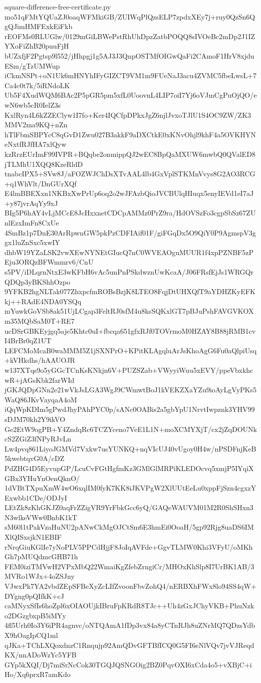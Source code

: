 \documentclass[11pt]{article}
\theoremstyle{definition}
\theoremstyle{remark}
\begin{document}
\begin{filecontents*}[overwrite]{square-difference-free-certificate.py}
mo51qFMtYQUaZJ0oaqWFMkiGB/ZUIWqPlQzsELP7zpdxXEy7j+ruy0QzSn6QgQJimHMFExkEiFkb
rEOFMs0RLUGlw/0129mGiLBWePstRhUhDpzZatbPOQQ8sIVOeBc2mDp2J1IZYXoFiZhB20puuFjH
bUZxfjF2Pgtsp9l552/jHhpgj1g5AJ3J3QnpOSTMfOIGwQaFi2CAmoF1HrV8xjduESm/gTzUMWup
iCkmNSPt+oN1Uk6mHNYhIFyGIZCT9VM1m9FUeNaJ3acu4ZVMC5fbeLwsL+7Ca4c0t7k/5iRNdoLK
Ub5F4XudWQM6BAc2P5pGR5pm5xfL0UoovnL4LIP7oiI7Yj6oVJmCgPuOjQO/ewN6wb5cR0IelZ3s
KxlRyn4L6kZZEClyw1I7fo+Ker4IQCfpDPkxJgZ6njlJvxoTJlU1S4OC9ZW/ZK3MMV2ma9KQ+nZn
hTlFbmSBPYcC8qGvD1Zwu027B3akkF9aDXCtkE0xKNvOhjl9khF4a5OVKHYNeNxtfRJfHA7xlQyw
kzRrzEUrImF99IVPR+BQqbe2onmippQJ2wEC8BpQaMXUW6mwbQ0QValED8jTLMhU1XQQ8KzeRldD
tnabcIPX5+SVw8J/aFOZWJChDsXTvAAL4lb4GxVplSTKMnVvys8G2AO3RCG+q1WhVlt/DnGUrXQf
E4lmBBEXxn1NKBxXwPrUp6oq2o2wJFAzbQioJVCBUlqHIuqx5enyIEVd1eI7aJ+y87jvrAqYy9xJ
BIg5P6hAY4vLjMCcE8JcHxxnetCDCpAMMz0PrZ9ra/HdOVSzFo3cgpSbSz67ZUnlEzxImFn8CxUe
4SmBz1p7DnE30ArRpwnGW5pkPzCDFIAif01F/giFGqDx5O9QiY0P9AgmspV3ggx1luZnSxc5xwIY
dhbW19YZaLSK2vwXEwNYNEtGIucQ7nC0WVEAOguMUUR1f4xpPZNBF5zPEju3ORQzBFWmmrv6/CnU
s5PV/iDLqrnNtxE3wKFbH6vAc5unPnPSkdwznUwKcaA/J06FRsfEjJs1WRGQrQDQp3yBKShhOzpo
9YFKB2hgNLTak077ZhxpcfmROBsBzjK8LTEO8FqjDtUHXQfT9aYDHZKyEFKkj++RAdE4NDA0YSQq
mYuwkGoVSb8ak51UjLCgap3FeltRJ0sfM4u8ksSQKxlGT7pBJuPshFAVGVKOXm35MQbSaM0T+RE7
ucDSrGBKEyjgq5aje5Khtc0uI+fbcqa651gfxRJf0TOVrmoM0HZAY8B88jRMB1cvI4BrBr0qZ1UT
LEFCMoMcaB0waMMM5Z1jSXNPrO+KPitKLAgqluArJsKhoAgG6Fu0aQlpiUsq+kVHkdhs/hAAUOJR
w137XTqs9o5yGGcTCnKsKNkjn6V+PUZSZab+VWyyiWuu5xEVY/ppeVbxkhcwR+jAGsKbk2farWId
jGKJQDpGNn2e21wVkJsLGA3WgJ9CWmwtBoJ1kVEKZXaYZu9ioAyLgVyPKs5WaQ86JKvVayqaA4oM
iQqWpKDIm5gPwdJhyPAhPYC0p/sANc0OABis2a5gbYpU1NrvtIwpznk3YHV99sDJM70kh2Y9ikVO
Ge2EtW9ogPB+Y4ZndqRc6TCZYceno7VeE1L1N+moXCMYXjT/cx2jZqDOUNkcS2ZGiZ3fNPyRJvLn
Lw4pvq861LiyoJGMVd7Vxkw7usYUNKQ+nqVIcUJ40vUgoy0H4w/nPSDFnjKeB5kwebtqvG0A/cDZ
PdZHG4D5EyvupGP/LcuCvFGtHgfmKz3GMlGlMRPiKLEDOcvq5xmjP5IYqiXGBx3YHuYnOenQknO/
1dVBtTXpuXmW4wO6xqlIM0fyK7KK8iJKVPgW2XlUUtEeLu0xppFjSzn4cgxzYExwbb1CDe/ODJyI
LEtZk8zKhGKJZ0aqFrZZigVR9YrFbkGcc6yQ/GAQeWAUVM01M2R0ShSHxn3N3wlkeVWw0BnbK1kT
sM60l1tPakVzaHuNU2pANwCkMgOJCtSm6E3hmEi0OoaH/5gp92Rjg8uaDS6IMXlQISxsjkN1EBIF
rNrqGiuKGlIe7yNoPLV5PPCdHjjF8JoIqAVFde+GgvTLMW0Khi3VFyU/oMKhGh7pMUQdmcGHB71h
FEM0iziTMVwH2VPxMbQ22WmaiKgZfebZrngiCr/MHOxKhSlp8I7UrBK1AB/3MVRo1WJx+4oZSJny
VJwxPk7YA2vbdZEpSFBeXyZcLIfZvoonFbvZohQ4/nERBXhFWx8lo94SS4qW+DYgng0pQIfkK+cJ
caMNyxSfIs6hoZpl6xOIAOUjkIBruFpKRdR8TJc++Uh4zGxJChyVKB+PhuNzko2DGzgbxpB5iMYy
4fl5Urh0Io3Y6iPR4agnvc/oNTQAmA1fDp3vx84a8yCTnRJh8uZNrMQ7QDzsYdbX9hOagIpCQ1ml
qJKa+TChLXQoxdnzC1Rnqujp92AmQDvGFTBfICQ0G5FI6eNlVQv7jvVJReqdKX/nnADoWzYc5YFB
GYp5kXQI/Dj7miSrNcCok30TGQJQSNGOig2BZ0PqvOXI6xCda4o5+vXBjC+iHo/Xq6prxR7amKdo

\end{filecontents*}
\end{document}
